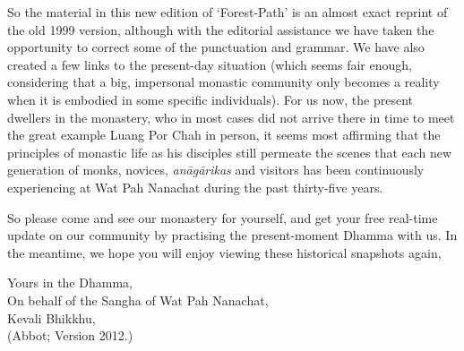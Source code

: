 So the material in this new edition of `Forest-Path' is an almost exact
reprint of the old 1999 version, although with the editorial assistance
we have taken the opportunity to correct some of the punctuation and
grammar. We have also created a few links to the present-day situation
 (which seems fair enough, considering that a big, impersonal monastic
community only becomes a reality when it is embodied in some specific
individuals). For us now, the present dwellers in the monastery, who in
most cases did not arrive there in time to meet the great example Luang
Por Chah in person, it seems most affirming that the principles of
monastic life as his disciples still permeate the scenes that each new
generation of monks, novices, \emph{anāgārikas} and visitors has been
continuously experiencing at Wat Pah Nanachat during the past
thirty-five years. 

So please come and see our monastery for yourself, and get your free
real-time update on our community by practising the present-moment
Dhamma with us. In the meantime, we hope you will enjoy viewing these
historical snapshots again, 

Yours in the Dhamma,\\
On behalf of the Sangha of Wat Pah Nanachat,\\
Kevali Bhikkhu,\\
(Abbot; Version 2012.) 

